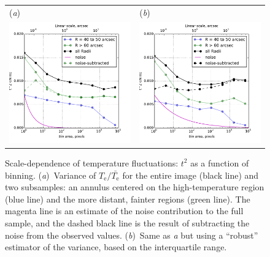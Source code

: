 \documentclass[preprint, 10pt]{aastex}
\newcommand\elec{\ensuremath{_{\mathrm{e}}}}
\newcommand\Te{\ensuremath{T\elec}}
\begin{document}
\begin{figure}
  \centering

  \begin{tabular}{ll}
    (\textit{a}) & (\textit{b}) \\
    \includegraphics[width=0.45\linewidth]{Tsq-nii-vs-binning-normal} &
    \includegraphics[width=0.45\linewidth]{Tsq-nii-vs-binning-robust}
  \end{tabular}
  \caption{Scale-dependence of temperature fluctuations: \(t^2\) as a
    function of binning. (\textit{a})~Variance of \(\Te/\bar{\Te}\)
    for the entire image (black line) and two subsamples: an annulus
    centered on the high-temperature region (blue line) and the more
    distant, fainter regions (green line).  The magenta line is an
    estimate of the noise contribution to the full sample, and the
    dashed black line is the result of subtracting the noise from the
    observed values.  (\textit{b})~Same as \textit{a} but using a
    ``robust'' estimator of the variance, based on the interquartile range.}
  \label{fig:tsq-nii-vs-binning}
\end{figure}
\end{document}
